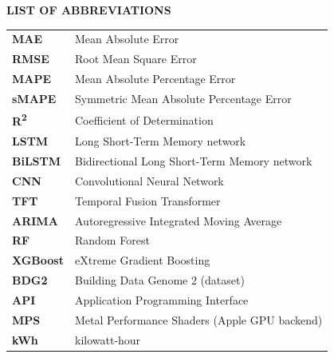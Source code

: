 \documentclass[12pt,a4paper,openany]{report}
\begin{document}
\newpage

\renewcommand{\contentsname}{TABLE OF CONTENTS}
\renewcommand{\listfigurename}{LIST OF FIGURES}
\renewcommand{\listtablename}{LIST OF TABLES}
\tableofcontents
\newpage
{}
\listoffigures
{}
\listoftables

\newpage

\begin{center}
\textbf{LIST OF ABBREVIATIONS}
\end{center}
\vspace{10pt}

\begin{tabular}{@{}p{3cm}l@{}}
\textbf{MAE}     & Mean Absolute Error \\
\textbf{RMSE}    & Root Mean Square Error \\
\textbf{MAPE}    & Mean Absolute Percentage Error \\
\textbf{sMAPE}   & Symmetric Mean Absolute Percentage Error \\
\textbf{R\textsuperscript{2}} & Coefficient of Determination \\
\textbf{LSTM}    & Long Short-Term Memory network \\
\textbf{BiLSTM}  & Bidirectional Long Short-Term Memory network \\
\textbf{CNN}     & Convolutional Neural Network \\
\textbf{TFT}     & Temporal Fusion Transformer \\
\textbf{ARIMA}   & Autoregressive Integrated Moving Average \\
\textbf{RF}      & Random Forest \\
\textbf{XGBoost} & eXtreme Gradient Boosting \\
\textbf{BDG2}    & Building Data Genome 2 (dataset) \\
\textbf{API}     & Application Programming Interface \\
\textbf{MPS}     & Metal Performance Shaders (Apple GPU backend) \\
\textbf{kWh}     & kilowatt-hour \\
\end{tabular}
\end{document}
